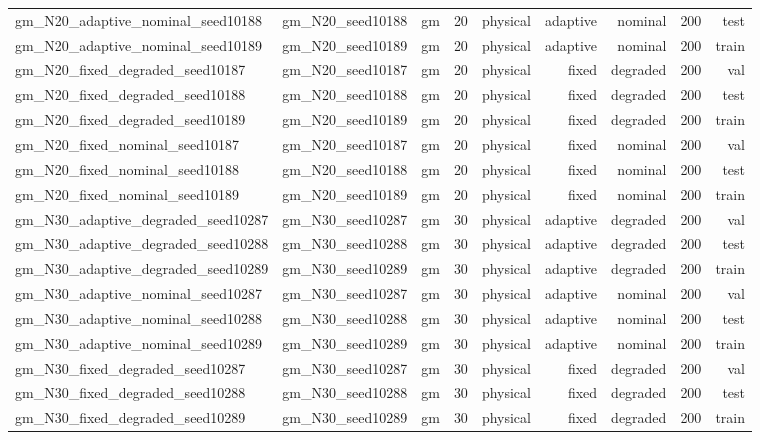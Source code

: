 \begin{tabular}{lrrrrrrrr}
gm\_N20\_adaptive\_nominal\_seed10188 & gm\_N20\_seed10188 & gm & 20 & physical & adaptive & nominal & 200 & test \\
gm\_N20\_adaptive\_nominal\_seed10189 & gm\_N20\_seed10189 & gm & 20 & physical & adaptive & nominal & 200 & train \\
gm\_N20\_fixed\_degraded\_seed10187 & gm\_N20\_seed10187 & gm & 20 & physical & fixed & degraded & 200 & val \\
gm\_N20\_fixed\_degraded\_seed10188 & gm\_N20\_seed10188 & gm & 20 & physical & fixed & degraded & 200 & test \\
gm\_N20\_fixed\_degraded\_seed10189 & gm\_N20\_seed10189 & gm & 20 & physical & fixed & degraded & 200 & train \\
gm\_N20\_fixed\_nominal\_seed10187 & gm\_N20\_seed10187 & gm & 20 & physical & fixed & nominal & 200 & val \\
gm\_N20\_fixed\_nominal\_seed10188 & gm\_N20\_seed10188 & gm & 20 & physical & fixed & nominal & 200 & test \\
gm\_N20\_fixed\_nominal\_seed10189 & gm\_N20\_seed10189 & gm & 20 & physical & fixed & nominal & 200 & train \\
gm\_N30\_adaptive\_degraded\_seed10287 & gm\_N30\_seed10287 & gm & 30 & physical & adaptive & degraded & 200 & val \\
gm\_N30\_adaptive\_degraded\_seed10288 & gm\_N30\_seed10288 & gm & 30 & physical & adaptive & degraded & 200 & test \\
gm\_N30\_adaptive\_degraded\_seed10289 & gm\_N30\_seed10289 & gm & 30 & physical & adaptive & degraded & 200 & train \\
gm\_N30\_adaptive\_nominal\_seed10287 & gm\_N30\_seed10287 & gm & 30 & physical & adaptive & nominal & 200 & val \\
gm\_N30\_adaptive\_nominal\_seed10288 & gm\_N30\_seed10288 & gm & 30 & physical & adaptive & nominal & 200 & test \\
gm\_N30\_adaptive\_nominal\_seed10289 & gm\_N30\_seed10289 & gm & 30 & physical & adaptive & nominal & 200 & train \\
gm\_N30\_fixed\_degraded\_seed10287 & gm\_N30\_seed10287 & gm & 30 & physical & fixed & degraded & 200 & val \\
gm\_N30\_fixed\_degraded\_seed10288 & gm\_N30\_seed10288 & gm & 30 & physical & fixed & degraded & 200 & test \\
gm\_N30\_fixed\_degraded\_seed10289 & gm\_N30\_seed10289 & gm & 30 & physical & fixed & degraded & 200 & train \\

\end{tabular}
